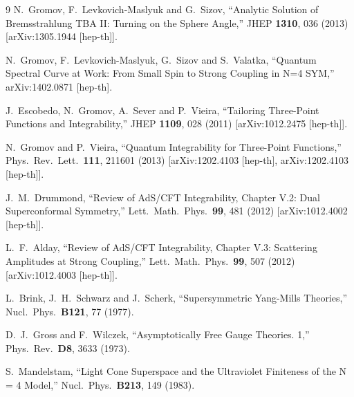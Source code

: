 \documentclass[a4paper]{article}
\numberwithin{equation}{section}
\begin{document}
\begin{thebibliography} {9}
  N.~Gromov, F.~Levkovich-Maslyuk and G.~Sizov,
  ``Analytic Solution of Bremsstrahlung TBA II: Turning on the Sphere Angle,''
  JHEP {\bf 1310}, 036 (2013)
  [arXiv:1305.1944 [hep-th]].
  
  N.~Gromov, F.~Levkovich-Maslyuk, G.~Sizov and S.~Valatka,
  ``Quantum Spectral Curve at Work: From Small Spin to Strong Coupling in N=4 SYM,''
  arXiv:1402.0871 [hep-th].
  
  J.~Escobedo, N.~Gromov, A.~Sever and P.~Vieira,
  ``Tailoring Three-Point Functions and Integrability,''
  JHEP {\bf 1109}, 028 (2011)
  [arXiv:1012.2475 [hep-th]].
  
  N.~Gromov and P.~Vieira,
  ``Quantum Integrability for Three-Point Functions,''
  Phys.\ Rev.\ Lett.\  {\bf 111}, 211601 (2013)
  [arXiv:1202.4103 [hep-th], arXiv:1202.4103 [hep-th]].
  
  J.~M.~Drummond,
  ``Review of AdS/CFT Integrability, Chapter V.2: Dual Superconformal Symmetry,''
  Lett.\ Math.\ Phys.\  {\bf 99}, 481 (2012)
  [arXiv:1012.4002 [hep-th]].
  
  L.~F.~Alday,
  ``Review of AdS/CFT Integrability, Chapter V.3: Scattering Amplitudes at Strong Coupling,''
  Lett.\ Math.\ Phys.\  {\bf 99}, 507 (2012)
  [arXiv:1012.4003 [hep-th]].
  
 L.~Brink, J.~H.~Schwarz and J.~Scherk, 
 ``Supersymmetric Yang-Mills Theories,''
  Nucl.\ Phys.\ {\bf B121}, 77 (1977).

	D.~J.~Gross and F.~Wilczek, 
	``Asymptotically Free Gauge Theories. 1,''
	Phys.\ Rev.\ {\bf D8}, 3633 (1973).

	S.~Mandelstam,
	``Light Cone Superspace and the Ultraviolet Finiteness of the N = 4 Model,''
	Nucl.\ Phys.\ {\bf B213}, 149 (1983).


\end{thebibliography}
\end{document}
